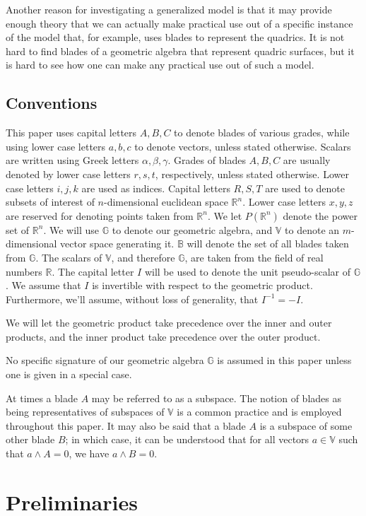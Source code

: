 \documentclass{birkjour}
\theoremstyle{definition}
\theoremstyle{remark}
\numberwithin{equation}{section}
\newcommand{\R}{\mathbb{R}}
\newcommand{\B}{\mathbb{B}}
\newcommand{\G}{\mathbb{G}}
\newcommand{\V}{\mathbb{V}}
\begin{document}
Another reason for investigating a generalized model is that it may provide enough theory that
we can actually make practical use out of a specific instance of the model that, for example,
uses blades to represent the quadrics.  It is not hard to find blades of a geometric algebra that
represent quadric surfaces, but it is hard to see how one can make any practical use out of such a model.

\subsection{Conventions}

This paper uses capital letters $A,B,C$ to denote blades of various grades,
while using lower case letters $a,b,c$ to denote vectors, unless stated otherwise.  Scalars are written
using Greek letters $\alpha,\beta,\gamma$.  Grades of blades $A,B,C$ are usually
denoted by lower case letters $r,s,t$, respectively, unless stated otherwise.  Lower case letters $i,j,k$ are
used as indices.  Capital letters $R,S,T$
are used to denote subsets of interest of $n$-dimensional euclidean space $\R^n$.
Lower case letters $x,y,z$ are reserved for denoting points taken from $\R^n$.  We
let $P(\R^n)$ denote the power set of $\R^n$.
We will use $\G$ to denote our geometric algebra, and $\V$ to denote an $m$-dimensional vector
space generating it.  $\B$ will denote the set of all blades taken from $\G$.  The
scalars of $\V$, and therefore $\G$, are taken from the field of real numbers $\R$.
The capital letter $I$ will be used to denote the unit pseudo-scalar of $\G$.  We assume
that $I$ is invertible with respect to the geometric product.  Furthermore, we'll assume, without
loss of generality, that $I^{-1}=-I$.

We will let the geometric product take precedence over the inner and outer products,
and the inner product take precedence over the outer product.

No specific signature of our geometric algebra $\G$ is assumed in this paper unless
one is given in a special case.

At times a blade $A$ may be referred to as a subspace.  The notion of blades as being
representatives of subspaces of $\V$ is a common practice and is employed throughout this paper.
It may also be said that a blade $A$ is a subspace of some other blade $B$; in which case,
it can be understood that for all vectors $a\in\V$ such that $a\wedge A=0$, we have $a\wedge B=0$.

\section{Preliminaries}
\end{document}
